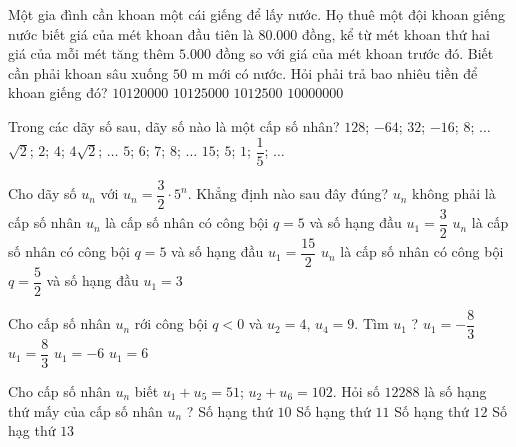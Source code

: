 \begin{ex}%
Một gia đình cần khoan một cái giếng để lấy nước. Họ thuê một đội khoan giếng nước biết giá của mét khoan đầu tiên là $80.000$ đồng, kể từ mét khoan thứ hai giá của mỗi mét tăng thêm $5.000$ đồng so với giá của mét khoan trước đó. Biết cần phải khoan sâu xuống $50$ m mới có nước. Hỏi phải trả bao nhiêu tiền để khoan giếng đó?
	\choice
	{$10120000$}
	{\True $10125000$}
	{$1012500$}
	{$10000000$}
\end{ex}
\begin{ex}%
Trong các dãy số sau, dãy số nào là một cấp số nhân?
	\choice
	{\True $128$; $-64$; $32$; $-16$; $8$; $\ldots$}
	{$\sqrt{2}$; $2$; $4$; $4 \sqrt{2}$; $\ldots$}
	{$5$; $6$; $7$; $8$; $\ldots$}
	{$15$; $5$; $1$; $\dfrac{1}{5}$; $\ldots$}
	\loigiai{}
\end{ex}
\begin{ex}%
Cho dãy số $u_n$ với $u_n=\dfrac{3}{2} \cdot 5^n$. Khẳng định nào sau đây đúng?
	\choice
	{$u_{n}$ không phải là cấp số nhân}
	{$u_{n}$ là cấp số nhân có công bội $q=5$ và số hạng đầu $u_{1}=\dfrac{3}{2}$}
	{\True $u_n$ là cấp số nhân có công bội $q=5$ và số hạng đầu $u_{1}=\dfrac{15}{2}$}
	{$u_n$ là cấp số nhân có công bội $q=\dfrac{5}{2}$ và số hạng đầu $u_{1}=3$}
	\loigiai{}
\end{ex}
\begin{ex}%
Cho cấp số nhân $u_n$ rới công bội $q <0$ và $u_2=4$, $u_4=9$. Tìm $u_{1}$ ?
	\choice
	{$u_1=-\dfrac{8}{3}$}
	{$u_1=\dfrac{8}{3}$}
	{\True $u_1=-6$}
	{$u_1=6$}
\end{ex}
\begin{ex}%
	Cho cấp số nhân $u_n$ biết $u_1+u_5=51$; $u_2+u_{6}=102$. Hỏi số $12288$ là số hạng thứ mấy của cấp số nhân $u_n$ ?
	\choice
	{Số hạng thứ $10$}
	{Số hạng thứ $11$}
	{Số hạng thứ $12$}
	{\True Số hạg thứ $13$}
\end{ex}
